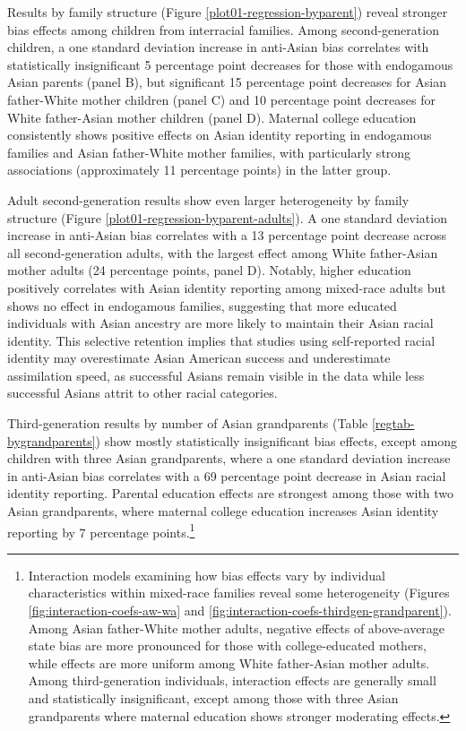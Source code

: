 Results by family structure (Figure \ref{plot01-regression-byparent}) reveal stronger bias effects among children from interracial families. Among second-generation children, a one standard deviation increase in anti-Asian bias correlates with statistically insignificant 5 percentage point decreases for those with endogamous Asian parents (panel B), but significant 15 percentage point decreases for Asian father-White mother children (panel C) and 10 percentage point decreases for White father-Asian mother children (panel D). Maternal college education consistently shows positive effects on Asian identity reporting in endogamous families and Asian father-White mother families, with particularly strong associations (approximately 11 percentage points) in the latter group.

Adult second-generation results show even larger heterogeneity by family structure (Figure \ref{plot01-regression-byparent-adults}). A one standard deviation increase in anti-Asian bias correlates with a 13 percentage point decrease across all second-generation adults, with the largest effect among White father-Asian mother adults (24 percentage points, panel D). Notably, higher education positively correlates with Asian identity reporting among mixed-race adults but shows no effect in endogamous families, suggesting that more educated individuals with Asian ancestry are more likely to maintain their Asian racial identity. This selective retention implies that studies using self-reported racial identity may overestimate Asian American success and underestimate assimilation speed, as successful Asians remain visible in the data while less successful Asians attrit to other racial categories.

Third-generation results by number of Asian grandparents (Table \ref{regtab-bygrandparents}) show mostly statistically insignificant bias effects, except among children with three Asian grandparents, where a one standard deviation increase in anti-Asian bias correlates with a 69 percentage point decrease in Asian racial identity reporting. Parental education effects are strongest among those with two Asian grandparents, where maternal college education increases Asian identity reporting by 7 percentage points.\footnote{Interaction models examining how bias effects vary by individual characteristics within mixed-race families reveal some heterogeneity (Figures \ref{fig:interaction-coefs-aw-wa} and \ref{fig:interaction-coefs-thirdgen-grandparent}). Among Asian father-White mother adults, negative effects of above-average state bias are more pronounced for those with college-educated mothers, while effects are more uniform among White father-Asian mother adults. Among third-generation individuals, interaction effects are generally small and statistically insignificant, except among those with three Asian grandparents where maternal education shows stronger moderating effects.}

